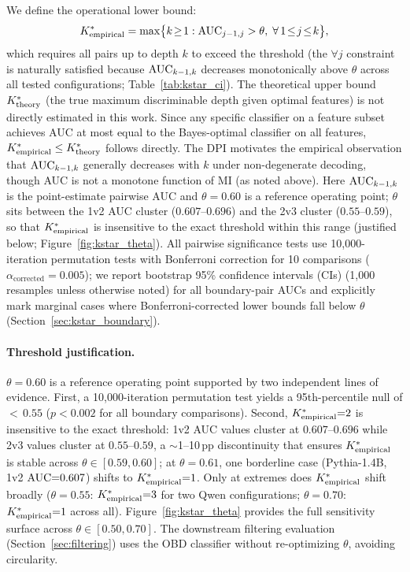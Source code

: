 We define the operational lower bound:
{\small
\begin{equation}
  {K^*_{\text{empirical}}} = \max\bigl\{k \!\geq\! 1 : \text{AUC}_{j-1,j} > \theta,\;\forall\, 1 \!\leq\! j \!\leq\! k\bigr\},
  \label{eq:kstar}
\end{equation}
}
which requires all pairs up to depth $k$ to exceed the threshold (the $\forall j$ constraint is naturally satisfied because $\text{AUC}_{k-1,k}$ decreases monotonically above $\theta$ across all tested configurations; Table~\ref{tab:kstar_ci}).
The theoretical upper bound ${K^*_{\text{theory}}}$ (the true maximum discriminable depth given optimal features) is not directly estimated in this work.
Since any specific classifier on a feature subset achieves AUC at most equal to the Bayes-optimal classifier on all features, ${K^*_{\text{empirical}}} \leq {K^*_{\text{theory}}}$ follows directly.
The DPI motivates the empirical observation that $\text{AUC}_{k-1,k}$ generally decreases with $k$ under non-degenerate decoding, though AUC is not a monotone function of MI (as noted above).
Here $\text{AUC}_{k-1,k}$ is the point-estimate pairwise AUC and $\theta = 0.60$ is a reference operating point; $\theta$ sits between the 1v2 AUC cluster ($0.607$--$0.696$) and the 2v3 cluster ($0.55$--$0.59$), so that ${K^*_{\text{empirical}}}$ is insensitive to the exact threshold within this range (justified below; Figure~\ref{fig:kstar_theta}).
All pairwise significance tests use 10{,}000-iteration permutation tests with Bonferroni correction for 10 comparisons ($\alpha_{\text{corrected}}{=}0.005$); we report bootstrap 95\% confidence intervals (CIs) (1{,}000 resamples unless otherwise noted) for all boundary-pair AUCs and explicitly mark marginal cases where Bonferroni-corrected lower bounds fall below $\theta$ (Section~\ref{sec:kstar_boundary}).

\paragraph{Threshold justification.}
$\theta{=}0.60$ is a reference operating point supported by two independent lines of evidence.
First, a 10{,}000-iteration permutation test yields a 95th-percentile null of ${<}\,0.55$ ($p < 0.002$ for all boundary comparisons).
Second, ${K^*_{\text{empirical}}}{=}2$ is insensitive to the exact threshold: 1v2 AUC values cluster at $0.607$--$0.696$ while 2v3 values cluster at $0.55$--$0.59$, a ${\sim}$1--10\,pp discontinuity that ensures ${K^*_{\text{empirical}}}$ is stable across $\theta \in [0.59, 0.60]$; at $\theta{=}0.61$, one borderline case (Pythia-1.4B, 1v2 $\text{AUC}{=}0.607$) shifts to ${K^*_{\text{empirical}}}{=}1$.
Only at extremes does ${K^*_{\text{empirical}}}$ shift broadly ($\theta{=}0.55$: ${K^*_{\text{empirical}}}{=}3$ for two Qwen configurations; $\theta{=}0.70$: ${K^*_{\text{empirical}}}{=}1$ across all).
Figure~\ref{fig:kstar_theta} provides the full sensitivity surface across $\theta \in [0.50, 0.70]$.
The downstream filtering evaluation (Section~\ref{sec:filtering}) uses the OBD classifier without re-optimizing $\theta$, avoiding circularity.

